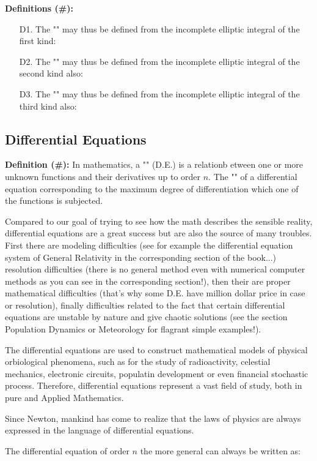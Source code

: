 	\textbf{Definitions (\#\mydef):}
	\begin{enumerate}
		\item[D1.] The "" may thus be defined from the incomplete elliptic integral of the first kind:
		
	
		\item[D2.] The "" may thus be defined from the incomplete elliptic integral of the second kind also:
		
	
		\item[D3.] The "" may thus be defined from the incomplete elliptic integral of the third kind also:
		
	\end{enumerate}
	
	\pagebreak
	\subsection{Differential Equations}
	\textbf{Definition (\#\mydef):} In mathematics, a "" (D.E.)  is a relationb etween one or more unknown functions and their derivatives up to order $n$. The "" of a differential equation corresponding to the maximum degree of differentiation which one of the functions is subjected.
	
	Compared to our goal of trying to see how the math describes the sensible reality, differential equations are a great success but are also the source of many troubles. First there are modeling difficulties (see for example the differential equation system of General Relativity in the corresponding section of the book...) resolution difficulties (there is no general method even with numerical computer methods as you can see in the corresponding section!), then their are proper mathematical difficulties (that's why some D.E. have million dollar price in case or resolution), finally difficulties related to the fact that certain differential equations are unstable by nature and give chaotic solutions (see the section Population Dynamics or Meteorology for flagrant simple examples!).
	
	\begin{tcolorbox}[title=Remark,colframe=black,arc=10pt]
	The differential equations are used to construct mathematical models of physical orbiological phenomena, such as for the study of radioactivity, celestial mechanics, electronic circuits, populatin development or even financial stochastic process. Therefore, differential equations represent a vast field of study, both in pure and Applied Mathematics.
	\end{tcolorbox}
	\begin{fquote}Since Newton, mankind has come to realize that the laws of physics are always expressed in the language of differential equations.
 	\end{fquote}
	The differential equation of order $n$ the more general can always be written as:
	
